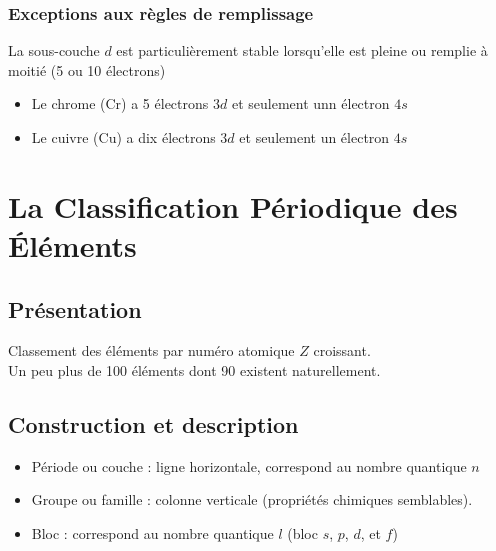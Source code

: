 \documentclass[13pt, twoside, a4paper, french, tikz]{report}
\begin{document}
{      \subsection{Exceptions aux règles de remplissage}\label{subsec:exceptions-aux-regles-de-remplissage}
      
      La sous-couche $d$ est particulièrement stable lorsqu'elle est pleine ou remplie à moitié (5 ou 10 électrons)
      \begin{itemize}
        \item Le chrome (Cr) a 5 électrons $3d$ et seulement unn électron $4s$
        \item Le cuivre (Cu) a dix électrons $3d$ et seulement un électron $4s$
      \end{itemize}
    }


\chapter{La Classification Périodique des Éléments}\label{ch:la-classification-periodique-des-elements}
  
  
  \section{Présentation}\label{sec:presentation}
    
    Classement des éléments par numéro atomique $Z$ croissant.\\
    Un peu plus de 100 éléments dont 90 existent naturellement.
  
  
  \section{Construction et description}\label{sec:construction-et-description}
    
    \resizebox{\textwidth}{!}{
      
    }
    
    \begin{itemize}
      \item Période ou couche : ligne horizontale, correspond au nombre quantique $n$
      \item Groupe ou famille : colonne verticale (propriétés chimiques semblables).
      \item Bloc : correspond au nombre quantique $l$ (bloc $s$, $p$, $d$, et $f$)
    \end{itemize}
    
    \vspace{7pt}
    
\end{document}
